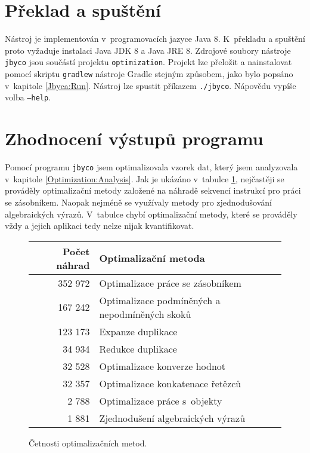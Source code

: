 \section{Překlad a spuštění}

Nástroj je implementován v~programovacích jazyce Java 8. K~překladu a spuštění proto vyžaduje instalaci Java JDK 8 a Java JRE 8. Zdrojové soubory nástroje \texttt{jbyco} jsou součástí projektu \texttt{optimization}. Projekt lze přeložit a nainstalovat pomocí skriptu \texttt{gradlew} nástroje Gradle stejným způsobem, jako bylo popsáno v~kapitole \ref{Jbyca:Run}. Nástroj lze spustit příkazem \texttt{./jbyco}. Nápovědu vypíše volba \texttt{---help}.


\section{Zhodnocení výstupů programu}\label{Jbyco:Results}

Pomocí programu \texttt{jbyco} jsem optimalizovala vzorek dat, který jsem analyzovala v~kapitole \ref{Optimization:Analysis}. Jak je ukázáno v~tabulce \ref{tab:methods}, nejčastěji se prováděly optimalizační metody založené na náhradě sekvencí instrukcí pro práci se zásobníkem. Naopak nejméně se využívaly metody pro zjednodušování algebraických výrazů. V~tabulce chybí optimalizační metody, které se prováděly vždy a jejich aplikaci tedy nelze nijak kvantifikovat.

\begin{figure}
\begin{center}
  \begin{tabular}{r l} \hline
  \textbf{Počet náhrad} & \textbf{Optimalizační metoda} \\\hline

352 972	&	Optimalizace práce se zásobníkem	\\
167 242	&	Optimalizace podmíněných a nepodmíněných skoků	\\
123 173	&	Expanze duplikace	\\
34 934	&	Redukce duplikace	\\
32 528	&	Optimalizace konverze hodnot	\\
32 357	&	Optimalizace konkatenace řetězců	\\
2 788	&	Optimalizace práce s~objekty	\\
1 881	&	Zjednodušení algebraických výrazů	\\\hline

  \end{tabular}
\end{center}
\caption{Četnosti optimalizačních metod.}
\label{tab:methods}
\end{figure}

